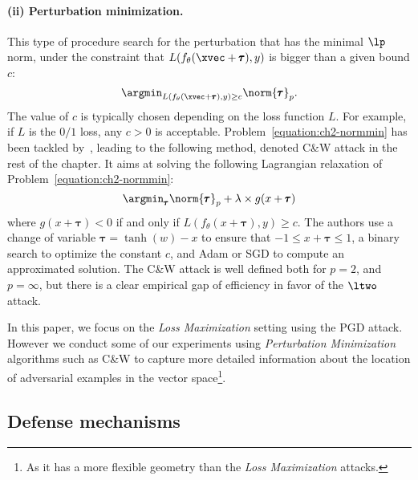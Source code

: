 \paragraph{(ii) Perturbation minimization.}
This type of procedure search for the perturbation that has the minimal $\lp$ norm, under the constraint that $L(f_\theta(\xvec + \pmb{\tau}), y)$ is bigger than a given bound $c$:
\begin{equation}
  \argmin_{L(f_\theta(\xvec + \pmb{\tau}), y) \geq c} \norm{\pmb{\tau}}_p.
  \label{equation:ch2-normmin}
\end{equation}
The value of $c$ is typically chosen depending on the loss function $L$. For example, if $L$ is the $0/1$ loss, any $c > 0$ is acceptable.
Problem~\ref{equation:ch2-normmin} has been tackled by~\citep{carlini2017towards}, leading to the following method, denoted C\&W attack in the rest of the chapter. It aims at solving the following Lagrangian relaxation of Problem~\ref{equation:ch2-normmin}:
\begin{equation}
  \argmin_{\pmb{\tau}} \norm{\pmb{\tau}}_p+ \lambda \times g(x+\pmb{\tau})
  \label{equation:ch2-CWproblem}
\end{equation}
where $g(x+\pmb{\tau})<0$ if and only if $L(f_\theta(x+\pmb{\tau}),y) \geq c$. 
The authors use a change of variable $\pmb{\tau}=\tanh(w)-x$ to ensure that $-1 \leq x+\pmb{\tau} \leq 1$, a binary search to optimize the constant $c$, and Adam or SGD to compute an approximated solution.
The C\&W attack is well defined both for $p=2$, and $p=\infty$, but there is a clear empirical gap of efficiency in favor of the $\ltwo$ attack.

In this paper, we focus on the \emph{Loss Maximization} setting using the PGD attack. However we conduct some of our experiments using \emph{Perturbation Minimization} algorithms such as C\&W to capture more detailed information about the location of adversarial examples in the vector space\footnote{As it has a more flexible geometry than the \emph{Loss Maximization} attacks.}. 

\subsection{Defense mechanisms}
\label{subsection:ch2-defense_mechanisms}

